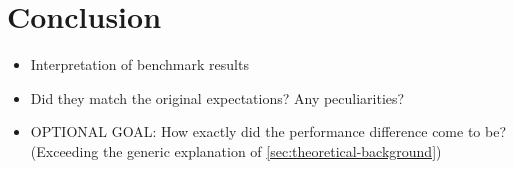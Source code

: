  
\cleardoubleoddpage
\chapter{Conclusion}
\label{sec:conclusion}

\begin{itemize}
  \item Interpretation of benchmark results
  \item Did they match the original expectations? Any peculiarities?
  \item OPTIONAL GOAL: How exactly did the performance difference come to be? (Exceeding the generic explanation of \autoref{sec:theoretical-background})
\end{itemize}

